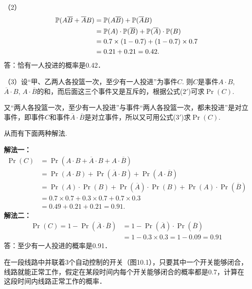 \begin{solution}
（2）
\[\begin{split}
    \mathbb{P}(A\overline{B}+\overline{A}B)&=\mathbb{P}(A\overline{B})+\mathbb{P}(\overline{A}B)\\
&=\mathbb{P}(A)\cdot \mathbb{P}(\overline{B})+\mathbb{P}(\overline{A})\cdot \mathbb{P}(B)\\
&=0.7\times(1-0.7)+(1-0.7)\times0.7\\
&=0.21+0.21=0.42.    
\end{split}\]
答：恰有一人投进的概率是0.42．
\end{solution}

\begin{analyze}
（3）设“甲、乙两人各投篮一次，至少有一人投进”为事件$C$. 则$C$是事件$A\cdot B$, $\overline{A}\cdot B$, $A\cdot \overline{B}$的和，而后面这三个事件又是互斥的，根据公式($2'$)可求$\Pr(C)$.

又“两人各投篮一次，至少有一人投进”与事件“两人各投篮一次，都未投进”是对立事件，即事件$C$和事件$\overline{A}\cdot \overline{B}$是对立事件，所以又可用公式($3'$)求$\Pr(C)$.

从而有下面两种解法.    
\end{analyze}

\begin{solution}
\textbf{解法一：}\[\begin{split}
    \Pr(C)&=\Pr(A\cdot  B+\overline{A}\cdot B+A\cdot\overline{B})\\
    &=\Pr(A\cdot B)+\Pr(\overline{A}\cdot B)+\Pr(A\cdot \overline{B})\\
    &=\Pr(A)\cdot \Pr(B)+\Pr(\overline{A})\cdot \Pr(B)+\Pr(A)\cdot \Pr(\overline{B})\\
&=0.7\times0.7+0.3\times0.7+0.7\times0.3\\
&=0.49+0.21+0.21 =0.91.
\end{split}\]
\textbf{解法二：}
\[\begin{split}
    \Pr(C)=1-\Pr(\overline{A}\cdot\overline{B})
    &=1-\Pr(\overline{A})\cdot \Pr(\overline{B})\\
    &=1-0.3\times0.3=1-0.09=0.91
\end{split}\]
答：至少有一人投进的概率是0.91．
\end{solution}

\noindent
\begin{minipage}{.57\textwidth}
    \begin{example}
    在一段线路中并联着3个自动控制的开关（图10.1），只要其中一个开关能够闭合，线路就能正常工作，假定在某段时间内每个开关能够闭合的概率都是0.7，计算在这段时间内线路正常工作的概率．
\end{example}
\end{minipage}\hfill
\begin{minipage}{.4\textwidth}
    \centering
{}
\end{minipage}


